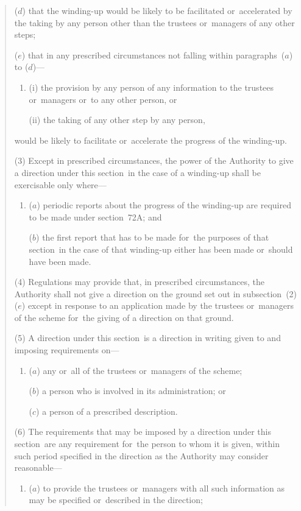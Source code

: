\documentclass[12pt,a4paper]{article}
\begin{document}
\begin{quotation}
\begin{enumerate}
($d$) that the winding-up would be likely to be facilitated or~accelerated by the taking by any person other than the trustees or~managers of any other steps;

($e$) that in any prescribed circumstances not falling within paragraphs~($a$)  to ($d$)—
\begin{enumerate}\item[]
(i) the provision by any person of any information to the trustees or~managers or~to any other person, or

(ii) the taking of any other step by any person,
\end{enumerate}
would be likely to facilitate or~accelerate the progress of the winding-up.
\end{enumerate}

(3) Except in prescribed circumstances, the power of the Authority to give a direction under this section~in the case of a winding-up shall be exercisable only where—
\begin{enumerate}\item[]
($a$) periodic reports about the progress of the winding-up are required to be made under section~72A; and

($b$) the first report that has to be made for~the purposes of that section~in the case of that winding-up either has been made or~should have been made.
\end{enumerate}

(4) Regulations may provide that, in prescribed circumstances, the Authority shall not give a direction on the ground set out in subsection~(2)($e$)  except in response to an application made by the trustees or~managers of the scheme for~the giving of a direction on that ground.

(5) A direction under this section~is a direction in writing given to and imposing requirements on—
\begin{enumerate}\item[]
($a$) any or~all of the trustees or~managers of the scheme;

($b$) a person who is involved in its administration; or

($c$) a person of a prescribed description.
\end{enumerate}

(6) The requirements that may be imposed by a direction under this section~are any requirement for~the person to whom it is given, within such period specified in the direction as the Authority may consider reasonable—
\begin{enumerate}\item[]
($a$) to provide the trustees or~managers with all such information as may be specified or~described in the direction;


\end{enumerate}
\end{quotation}
\end{document}
